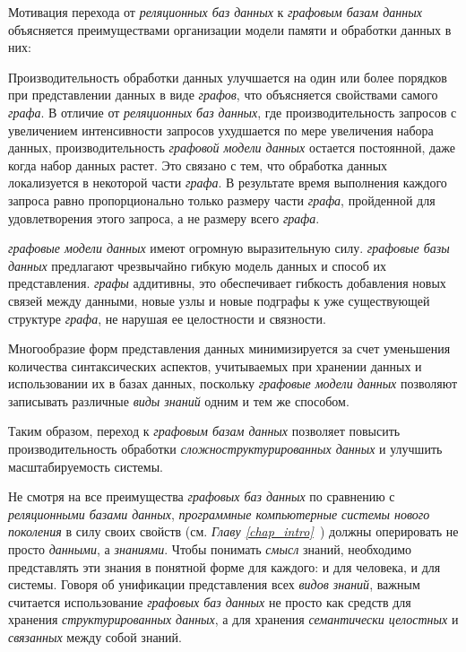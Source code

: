 Мотивация перехода от \textit{реляционных баз данных} к \textit{графовым базам данных} объясняется преимуществами организации модели памяти и обработки данных в них:
\begin{textitemize}
    \item Производительность обработки данных улучшается на один или более порядков при представлении данных в виде \textit{графов}, что объясняется свойствами самого \textit{графа}. В отличие от \textit{реляционных баз данных}, где производительность запросов с увеличением интенсивности запросов ухудшается по мере увеличения набора данных, производительность \textit{графовой модели данных} остается постоянной, даже когда набор данных растет. Это связано с тем, что обработка данных локализуется в некоторой части \textit{графа}. В результате время выполнения каждого запроса равно пропорционально только размеру части \textit{графа}, пройденной для удовлетворения этого запроса, а не размеру всего \textit{графа}.
    \item \textit{графовые модели данных} имеют огромную выразительную силу. \textit{графовые базы данных} предлагают чрезвычайно гибкую модель данных и способ их представления. \textit{графы} аддитивны, это обеспечивает гибкость добавления новых связей между данными, новые узлы и новые подграфы к уже существующей структуре \textit{графа}, не нарушая ее целостности и связности.
   	\item Многообразие форм представления данных минимизируется за счет уменьшения количества синтаксических аспектов, учитываемых при хранении данных и использовании их в базах данных, поскольку \textit{графовые модели данных} позволяют записывать различные \textit{виды знаний} одним и тем же способом.
\end{textitemize}

Таким образом, переход к \textit{графовым базам данных} позволяет повысить производительность обработки \textit{сложноструктурированных данных} и улучшить масштабируемость системы.

Не смотря на все преимущества \textit{графовых баз данных} по сравнению с \textit{реляционными базами данных}, \textit{программные компьютерные системы нового поколения} в силу своих свойств (см. \textit{Главу \ref{chap_intro}~}) должны оперировать не просто \textit{данными}, а \textit{знаниями}. Чтобы понимать \textit{смысл} знаний, необходимо представлять эти знания в понятной форме для каждого: и для человека, и для системы. Говоря об унификации представления всех \textit{видов знаний}, важным считается использование \textit{графовых баз данных} не просто как средств для хранения \textit{структурированных данных}, а для хранения \textit{семантически целостных} и \textit{связанных} между собой знаний.

